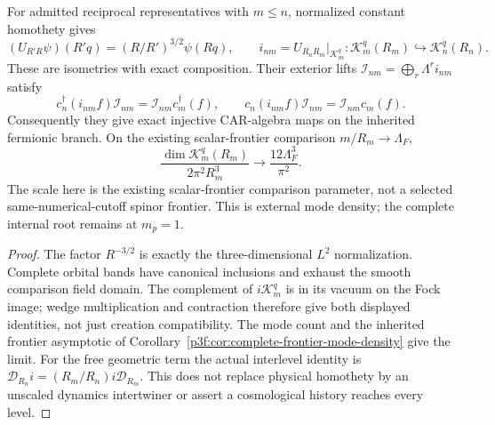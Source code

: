 \documentclass[12pt,a4paper]{article}
\begin{document}
\begin{proposition}
\label{p10:prop:v2189-spatial-car-density}
For admitted reciprocal representatives with $m\le n$, normalized constant
homothety gives
\[
 (U_{R'R}\psi)(R'q)=(R/R')^{3/2}\psi(Rq),\qquad
 i_{nm}=U_{R_nR_m}|_{\mathcal K_m^q}:
 \mathcal K_m^q(R_m)\hookrightarrow\mathcal K_n^q(R_n).
\]
These are isometries with exact composition. Their exterior lifts
$\mathcal I_{nm}=\bigoplus_r\Lambda^ri_{nm}$ satisfy
\[
 c_n^\dagger(i_{nm}f)\mathcal I_{nm}
 =\mathcal I_{nm}c_m^\dagger(f),\qquad
 c_n(i_{nm}f)\mathcal I_{nm}
 =\mathcal I_{nm}c_m(f).
\]
Consequently they give exact injective CAR-algebra maps on the inherited
fermionic branch. On the existing scalar-frontier comparison
$m/R_m\to\Lambda_F$,
\[
 \boxed{\frac{\dim\mathcal K_m^q(R_m)}{2\pi^2R_m^3}
       \longrightarrow\frac{12\Lambda_F^3}{\pi^2}.}
\]
The scale here is the existing scalar-frontier comparison parameter, not a
selected same-numerical-cutoff spinor frontier. This is external mode density;
the complete internal root remains at $m_p=1$.
\end{proposition}
\begin{proof}
The factor $R^{-3/2}$ is exactly the three-dimensional $L^2$ normalization.
Complete orbital bands have canonical inclusions and exhaust the smooth
comparison field domain. The complement of $i\mathcal K_m^q$ is in its
vacuum on the Fock image; wedge multiplication and contraction therefore
give both displayed identities, not just creation compatibility.
The mode count and the inherited frontier asymptotic of
Corollary~\ref{p3f:cor:complete-frontier-mode-density} give the limit.
For the free geometric term the actual interlevel identity is
$\mathcal D_{R_n}i=(R_m/R_n)i\mathcal D_{R_m}$.
This does not replace physical homothety by an unscaled dynamics
intertwiner or assert a cosmological history reaches every level.
\end{proof}
\end{document}

